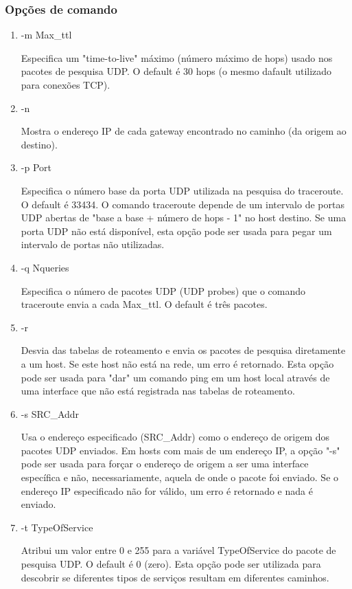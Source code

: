\documentclass[
	article,			%
	11pt,				%
	oneside,			%
	a4paper,			%
	english,			%
	brazil,				%
	sumario=tradicional
	]{abntex2}
\begin{document}
\subsubsection{Opções de comando}
\begin{enumerate}
	\item -m Max\_ttl
	
	Especifica um "time-to-live" máximo (número máximo de hops) usado nos pacotes de pesquisa UDP. O default é  30 hops  (o mesmo dafault utilizado para conexões TCP).
	
	\item -n
	
	Mostra o endereço IP de cada gateway encontrado no caminho (da origem ao destino).
	
		
	\item -p Port   
	
	Especifica o número base da porta UDP utilizada na pesquisa do traceroute. O default é 33434. O comando traceroute depende de um intervalo de portas UDP abertas de "base a base + número de hops - 1" no host destino. Se uma porta UDP não está disponível, esta opção pode ser usada para pegar um intervalo de portas não utilizadas.

	\item -q Nqueries 
	
	Especifica o número de pacotes UDP (UDP probes) que o comando traceroute envia a cada Max\_ttl. O default é três pacotes.
	
	\item -r  	
	
	Desvia das tabelas de roteamento e envia os pacotes de pesquisa diretamente a um host. Se este host não está na rede, um erro é retornado. Esta opção pode ser usada para "dar" um comando ping em um host local através de uma interface que não está registrada nas tabelas de roteamento.
	
	\item -s SRC\_Addr
		
	Usa o endereço especificado (SRC\_Addr) como o endereço de origem dos pacotes UDP enviados. Em hosts com mais de um endereço IP, a opção "-s" pode ser usada para forçar o endereço de origem a ser uma interface específica e não, necessariamente, aquela de onde o pacote foi enviado. Se o endereço IP especificado não for válido, um erro é retornado e nada é enviado.
	

	\item -t TypeOfService
	
	Atribui um valor entre 0 e 255 para a variável TypeOfService do pacote de pesquisa UDP. O default é 0 (zero). Esta opção pode ser utilizada para descobrir se diferentes tipos de serviços resultam em diferentes caminhos.
	

\end{enumerate}
\end{document}
